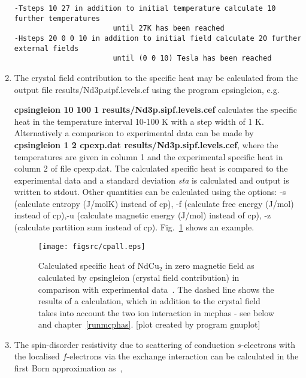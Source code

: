 \begin{enumerate}
\begin{verbatim}
-Tsteps 10 27 in addition to initial temperature calculate 10 further temperatures
                       until 27K has been reached
-Hsteps 20 0 0 10 in addition to initial field calculate 20 further external fields
                       until (0 0 10) Tesla has been reached
\end{verbatim}        


\item The crystal field contribution to the specific heat may be calculated 
from the output file {\prg results/Nd3p.sipf.levels.cf} using the  program {\prg cpsingleion},
e.g. 

{\bf cpsingleion 10 100 1 results/Nd3p.sipf.levels.cef}
calculates the specific heat in the temperature interval 10-100 K with a step width
of 1 K. Alternatively a comparison to experimental data can be made by
 {\bf cpsingleion  1 2 cpexp.dat results/Nd3p.sipf.levels.cef},
where the temperatures are given in column 1 and the experimental specific heat in column
2 of file {\prg cpexp.dat}. The calculated specific heat is compared to the experimental data
 and
a standard deviation {\em sta} is calculated and output is written to stdout.
Other quantities can be calculated using the options: -s  (calculate entropy  (J/molK) instead of cp),
-f (calculate free energy (J/mol) instead of cp),-u  (calculate magnetic energy (J/mol) instead of cp),
-z (calculate partition sum instead of cp).
Fig.~\ref{cpndcu2} shows an example.
\begin{figure}[ht]
\begin{center}
\texttt{[image: figsrc/cpall.eps]}
\caption{\label{cpndcu2}
Calculated specific heat of NdCu$_2$ in zero magnetic field as calculated
by {\prg cpsingleion} (crystal field contribution) in comparison with experimental
data~\cite{gratz91-9297}. The dashed line shows the results of a calculation,
which in addition to the crystal field takes into account the two ion interaction
 in {\prg mcphas} - see below and chapter~\ref{runmcphas}.
[plot created by program {\prg gnuplot}]}
\end{center}
\end{figure}

\item The spin-disorder resistivity due to scattering of conduction $s$-electrons with the localised
$f$-electrons via the exchange interaction can be calculated in the first Born approximation as~\cite{raowallace},


\end{enumerate}
